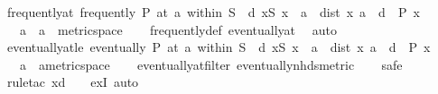 \begin{isabellebody}
\isamarkupfalse%
\ frequently{\isacharunderscore}{\kern0pt}at{\isacharcolon}{\kern0pt}\ {\isachardoublequoteopen}frequently\ P\ {\isacharparenleft}{\kern0pt}at\ a\ within\ S{\isacharparenright}{\kern0pt}\ {\isasymlongleftrightarrow}\ {\isacharparenleft}{\kern0pt}{\isasymforall}d{\isachargreater}{\kern0pt}{}{\isachardot}{\kern0pt}\ {\isasymexists}x{\isasymin}S{\isachardot}{\kern0pt}\ x\ {\isasymnoteq}\ a\ {\isasymand}\ dist\ x\ a\ {\isacharless}{\kern0pt}\ d\ {\isasymand}\ P\ x{\isacharparenright}{\kern0pt}{\isachardoublequoteclose}\isanewline
\ \ \ a\ {\isacharcolon}{\kern0pt}{\isacharcolon}{\kern0pt}\ {\isachardoublequoteopen}{\isacharprime}{\kern0pt}a\ {\isacharcolon}{\kern0pt}{\isacharcolon}{\kern0pt}\ metric{\isacharunderscore}{\kern0pt}space{\isachardoublequoteclose}\isanewline
%
\isadelimproof
\ \ %
\endisadelimproof
%
\isatagproof
{}\isamarkupfalse%
\ frequently{\isacharunderscore}{\kern0pt}def\ eventually{\isacharunderscore}{\kern0pt}at\ \isamarkupfalse%
\ auto%
\endisatagproof
{\isafoldproof}%
%
\isadelimproof
\isanewline
%
\endisadelimproof
\isanewline
{}\isamarkupfalse%
\ eventually{\isacharunderscore}{\kern0pt}at{\isacharunderscore}{\kern0pt}le{\isacharcolon}{\kern0pt}\ {\isachardoublequoteopen}eventually\ P\ {\isacharparenleft}{\kern0pt}at\ a\ within\ S{\isacharparenright}{\kern0pt}\ {\isasymlongleftrightarrow}\ {\isacharparenleft}{\kern0pt}{\isasymexists}d{\isachargreater}{\kern0pt}{}{\isachardot}{\kern0pt}\ {\isasymforall}x{\isasymin}S{\isachardot}{\kern0pt}\ x\ {\isasymnoteq}\ a\ {\isasymand}\ dist\ x\ a\ {\isasymle}\ d\ {\isasymlongrightarrow}\ P\ x{\isacharparenright}{\kern0pt}{\isachardoublequoteclose}\isanewline
\ \ \ a\ {\isacharcolon}{\kern0pt}{\isacharcolon}{\kern0pt}\ {\isachardoublequoteopen}{\isacharprime}{\kern0pt}a{\isacharcolon}{\kern0pt}{\isacharcolon}{\kern0pt}metric{\isacharunderscore}{\kern0pt}space{\isachardoublequoteclose}\isanewline
%
\isadelimproof
\ \ %
\endisadelimproof
%
\isatagproof
{}\isamarkupfalse%
\ eventually{\isacharunderscore}{\kern0pt}at{\isacharunderscore}{\kern0pt}filter\ eventually{\isacharunderscore}{\kern0pt}nhds{\isacharunderscore}{\kern0pt}metric\isanewline
\ \ \isamarkupfalse%
\ safe\isanewline
\ \ \isamarkupfalse%
\ {\isacharparenleft}{\kern0pt}rule{\isacharunderscore}{\kern0pt}tac\ x{\isacharequal}{\kern0pt}{\isachardoublequoteopen}d\ {\isacharslash}{\kern0pt}\ {}{\isachardoublequoteclose}\ \ exI{\isacharcomma}{\kern0pt}\ auto{\isacharparenright}{\kern0pt}\isanewline

\end{isabellebody}
